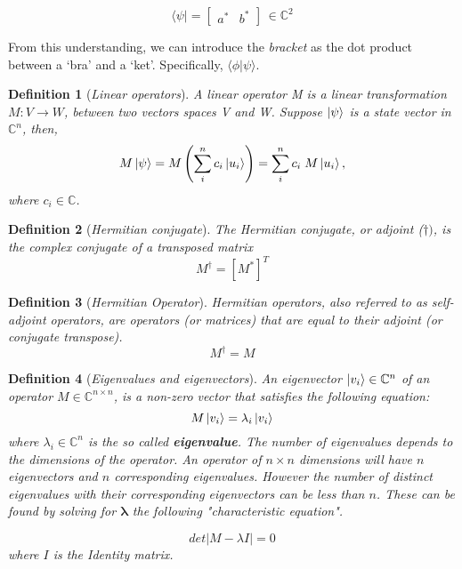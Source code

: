 \documentclass[12pt,a4paper]{report}
\newtheorem{definition}{Definition}
\newcommand{\abs}[1]{\left| #1 \right|}
\begin{document}
\[
\langle \psi| = 
\begin{bmatrix}
a^* & b^*
\end{bmatrix}
\, \in \mathbb{C}^2
\]

\noindent
From this understanding, we can introduce the \textit{bracket} as the dot product between a `bra' and a `ket'. Specifically, \(\langle \phi | \psi \rangle\).


\begin{definition}[\emph{Linear operators}]
A \emph{linear operator} M is a linear transformation $M: V \rightarrow W$, between two vectors spaces V and W. Suppose $\ket{\psi}$ is a state vector in $\mathbb{C}^n$, then,
\begin{equation}
    M\ket{\psi} = M \left(\sum_i^n c_i \ket{u_i}\right) 
    = \sum_i^n c_i \; M \ket{u_i},
\end{equation}
where $c_i \in \mathbb{C}$.
\end{definition}

\begin{definition}[\emph{Hermitian conjugate}]
The Hermitian conjugate, or \emph{adjoint} ($\dagger)$, is the complex conjugate of a transposed matrix
\begin{equation}
    M^{\dagger} = \left[M^*\right]^T
\end{equation}
\end{definition}

\begin{definition}[\emph{Hermitian Operator}]
Hermitian operators, also referred to as self-adjoint operators, are operators (or matrices) that are equal to their adjoint (or conjugate transpose).
\begin{equation}
    M^{\dagger} = M
\end{equation}
\end{definition} 

\begin{definition}[\emph{Eigenvalues and eigenvectors}]
An eigenvector $\ket{v_i} \in \mathbb{C}^n$ of an operator $M \in \mathbb{C}^{n \times n}$, is a non-zero vector that satisfies the following equation:
\begin{equation}
    M\ket{v_i} = \lambda_i \ket{v_i}
\end{equation}
where $\lambda_i \in \mathbb{C}^n$ is the so called \textbf{eigenvalue}. The number of eigenvalues depends to the dimensions of the operator. An operator of $n \times n$ dimensions will have $n$ eigenvectors and $n$ corresponding eigenvalues. However the number of distinct eigenvalues with their corresponding eigenvectors can be less than \(n\). These can be found by solving for \(\mathbf{\lambda}\) the following "characteristic equation".

\begin{equation}
    det \abs{M - \lambda \mathit{I}} = 0
\end{equation}
where \(I\) is the Identity matrix.
\end{definition}
\end{document}
